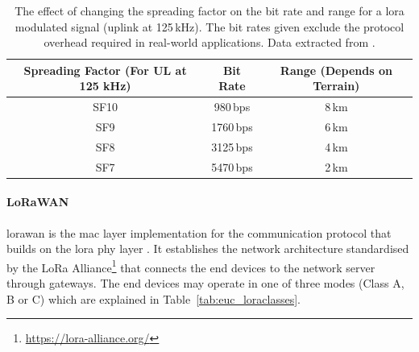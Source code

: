 \begin{table}[h!]
    \centering
    \begin{tabular}{c c c}
    \hline
        \textbf{Spreading Factor} (For UL at 125 kHz) & \textbf{Bit Rate} & \textbf{Range} (Depends on Terrain) \\
    \hline
        SF10 & 980\,bps & 8\,km \\
        SF9 & 1760\,bps & 6\,km \\
        SF8 & 3125\,bps & 4\,km \\
        SF7 & 5470\,bps & 2\,km \\
    \hline
    \end{tabular}
    \caption[LoRa Spreading Factors' Effect on Bit Rate and Range]{The effect of changing the spreading factor on the bit rate and range for a \gls{lora} modulated signal (uplink at 125\,kHz). The bit rates given exclude the protocol overhead required in real-world applications. Data extracted from \cite{semtech2024lora}.}
    \label{tab:euc_lorasf}
\end{table}

\paragraph{LoRaWAN} \gls{lorawan} is the \gls{mac} layer implementation for the communication protocol that builds on the \gls{lora} \gls{phy} layer \cite{semtech2024lora}. It establishes the network architecture standardised by the LoRa Alliance\footnote{\url{https://lora-alliance.org/}} that connects the end devices to the network server through gateways. The end devices may operate in one of three modes (Class A, B or C) which are explained in Table~\ref{tab:euc_loraclasses}. 

